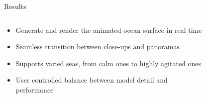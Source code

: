 \documentclass[final,hyperref={pdfpagelabels=true}]{beamer}
\begin{document}
\begin{frame}
\begin{center}
\begin{minipage}{\textwidth}
		\begin{block}{Results}
			\begin{columns}[t]
				\begin{column}{0.4\linewidth}
				\begin{itemize}
				\item Generate and render the animated ocean surface in real time
				\item Seamless transition between close-ups and panoramas
				\item Supports varied seas, from calm ones to highly agitated ones
				\item User controlled balance between model detail and performance
				\end{itemize}
				\end{column}
				\begin{column}{0.5\linewidth}
				\begin{figure}
				\centering
				\hfill
				\hfill
				\end{figure}
				\end{column}

\end{columns}
\end{block}
\end{minipage}
\end{center}
\end{frame}
\end{document}
